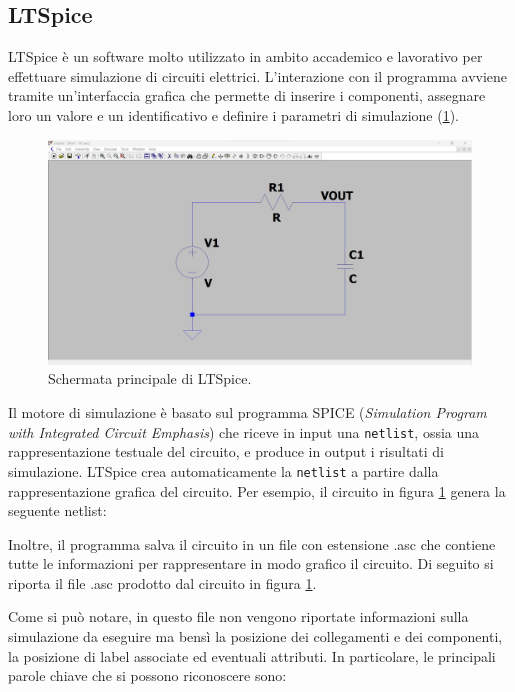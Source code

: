 \subsection{LTSpice}
LTSpice è un software molto utilizzato in ambito accademico e lavorativo per effettuare simulazione di circuiti elettrici. L'interazione con il programma avviene tramite un'interfaccia grafica che permette di inserire i componenti, assegnare loro un valore e un identificativo e definire i parametri di simulazione (\Fig\ref{fig:ltspice}).
\begin{figure}[h!]
	\centering
	\includegraphics[width=\textwidth]{./ImageFiles/LTSpice.jpg}
	\caption{Schermata principale di LTSpice.}
	\label{fig:ltspice}
\end{figure}
Il motore di simulazione è basato sul programma SPICE (\textit{Simulation Program with Integrated Circuit Emphasis}) che riceve in input una \texttt{netlist}, ossia una rappresentazione testuale del circuito, e produce in output i risultati di simulazione. LTSpice crea automaticamente la \texttt{netlist} a partire dalla rappresentazione grafica del circuito. Per esempio, il circuito in figura \ref{fig:ltspice} genera la seguente netlist:

Inoltre, il programma salva il circuito in un file con estensione .asc che contiene tutte le informazioni per rappresentare in modo grafico il circuito. Di seguito si riporta il file .asc prodotto dal circuito in figura \ref{fig:ltspice}.

Come si può notare, in questo file non vengono riportate informazioni sulla simulazione da eseguire ma bensì la posizione dei collegamenti e dei componenti, la posizione di label associate ed eventuali attributi. In particolare, le principali parole chiave che si possono riconoscere sono: 
